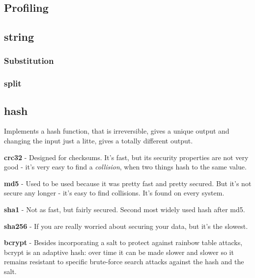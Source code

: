 \documentclass[12pt]{article}
\begin{document}
\subsection{Profiling}


\subsection{string}

\subsubsection{Substitution}



\subsubsection{split}


	

\subsection{hash}

Implements a hash function, that is irreversible, gives a unique output and changing the input just a litte, gives a totally different output.

\begin{list}{*}{
\setlength{\itemsep}{0pt}
\setlength{\parsep}{0pt}
\setlength{\topsep}{0pt}
\setlength{\partopsep}{0pt}
\setlength{\leftmargin}{2em}
\setlength{\labelwidth}{1.5em}
\setlength{\labelsep}{0.5em}
}
\item \textbf{crc32} - Designed for checksums. It's fast, but its security properties are not very good - it's very easy to find a \emph{collision}, when two things hash to the same value.
\item \textbf{md5} - Used to be used because it was pretty fast and pretty secured. But it's not secure any longer - it's easy to find collisions. It's found on every system.
\item \textbf{sha1} - Not as fast, but fairly secured. Second most widely used hash after md5.
\item \textbf{sha256} - If you are really worried about securing your data, but it's the slowest.
\item \textbf{bcrypt} - Besides incorporating a salt to protect against rainbow table attacks, bcrypt is an adaptive hash: over time it can be made slower and slower so it remains resistant to specific brute-force search attacks against the hash and the salt.
\end{list}
\end{document}
